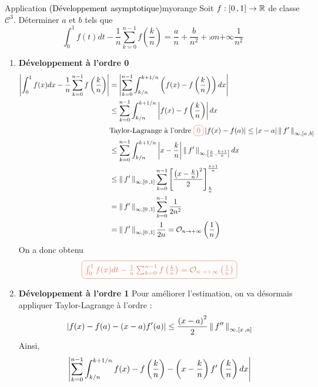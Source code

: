     \begin{omed}{Application \textcolor{black}{(Développement asymptotique)}}{myorange}
        Soit $f : \intervalleFF{0}{1} \to \mathbb{R}$ de classe $\mathcal{C}^3$. Déterminer $a$ et $b$ tels que 
        \[ \int_{0}^{1} f(t)dt - \frac{1}{n} \sum_{k=0}^{n-1} f\left(\frac{k}{n}\right) = \frac{a}{n} + \frac{b}{n^2} + \comp{o}{n}{+\infty}{\frac{1}{n^2}} \]   
        \begin{enumerate}
            \item \textbf{Développement à l’ordre 0} \quad 
            \begin{align*}
                \abs{\int_{0}^{1} f(x)dx - \frac{1}{n} \sum_{k=0}^{n-1} f\left(\frac{k}{n}\right)}
                &= \abs{\sum_{k=0}^{n-1} \int_{k/n}^{k+1/n} \left(f(x) - f\left(\frac{k}{n}\right)\right) dx} \\
                &\leq \sum_{k=0}^{n-1} \int_{k/n}^{k+1/n} \abs{f(x) - f\left(\frac{k}{n}\right)} dx \\
                & \text{Taylor-Lagrange à l’ordre } \lilbox{myorange}{0} \abs{f(x) - f(a)} \leq \abs{x-a} \nnorm{\infty,\intervalleFF{a}{b}}{f'} \\
                &\leq \sum_{k=0}^{n-1} \int_{k/n}^{k+1/n} \abs{x- \frac{k}{n}} \nnorm{\infty,\intervalleFF{\frac{k}{n}}{\frac{k+1}{n}}}{f'}  dx \\
                &\leq \nnorm{\infty,\intervalleFF{0}{1}}{f'} \sum_{k=0}^{n-1} \left[\frac{\left(x - \frac{k}{n}\right)^2}{2}\right]_{\frac{k}{n}}^{\frac{k+1}{n}} \\
                &= \nnorm{\infty,\intervalleFF{0}{1}}{f'} \sum_{k=0}^{n-1} \frac{1}{2n^2} \\
                &= \nnorm{\infty,\intervalleFF{0}{1}}{f'} \frac{1}{2n} = \comp{\mathcal{O}}{n}{+\infty}{\frac{1}{n}}
            \end{align*}
            On a donc obtenu 
            \[ \lilbox{myorange}{$\int_{0}^{1} f(x)dt - \frac{1}{n} \sum_{k=0}^{n-1}f\left(\frac{k}{n}\right) = \comp{\mathcal{O}}{n}{+\infty}{\frac{1}{n}}$} \]
            \item \textbf{Développement à l’ordre 1} \quad Pour améliorer l’estimation, on va désormais appliquer Taylor-Lagrange à l’ordre  :
            \[ \abs{f(x) - f(a) - (x-a) f'(a)} \leq \frac{\left(x - a\right)^2}{2} \nnorm{\infty,\intervalleFF{x}{a}}{f''} \]   
            Ainsi, 
            \begin{align*}
                \abs{\sum_{k=0}^{n-1} \int_{k/n}^{k+1/n} f(x) - f\left(\frac{k}{n}\right) - \left(x - \frac{k}{n}\right) f'\left(\frac{k}{n}\right) dx} 

\end{align*}
\end{enumerate}
\end{omed}
